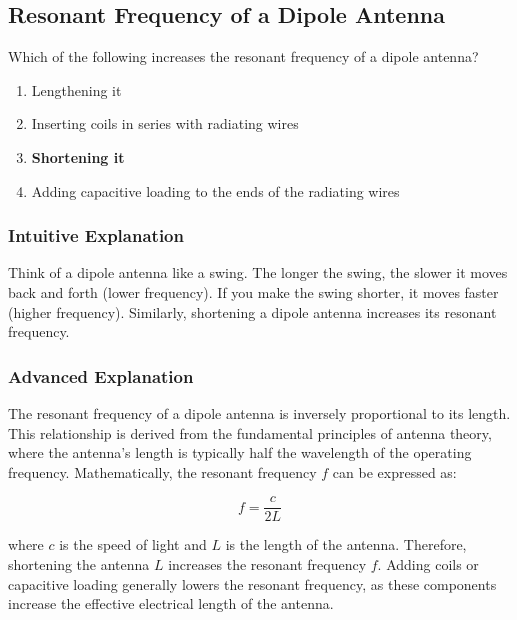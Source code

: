 \subsection{Resonant Frequency of a Dipole Antenna}
\label{T9A05}

\begin{tcolorbox}[colback=gray!10!white,colframe=black!75!black,title=T9A05]
Which of the following increases the resonant frequency of a dipole antenna?
\begin{enumerate}[noitemsep]
    \item Lengthening it
    \item Inserting coils in series with radiating wires
    \item \textbf{Shortening it}
    \item Adding capacitive loading to the ends of the radiating wires
\end{enumerate}
\end{tcolorbox}

\subsubsection*{Intuitive Explanation}
Think of a dipole antenna like a swing. The longer the swing, the slower it moves back and forth (lower frequency). If you make the swing shorter, it moves faster (higher frequency). Similarly, shortening a dipole antenna increases its resonant frequency.

\subsubsection*{Advanced Explanation}
The resonant frequency of a dipole antenna is inversely proportional to its length. This relationship is derived from the fundamental principles of antenna theory, where the antenna's length is typically half the wavelength of the operating frequency. Mathematically, the resonant frequency \( f \) can be expressed as:

\[ f = \frac{c}{2L} \]

where \( c \) is the speed of light and \( L \) is the length of the antenna. Therefore, shortening the antenna \( L \) increases the resonant frequency \( f \). Adding coils or capacitive loading generally lowers the resonant frequency, as these components increase the effective electrical length of the antenna.